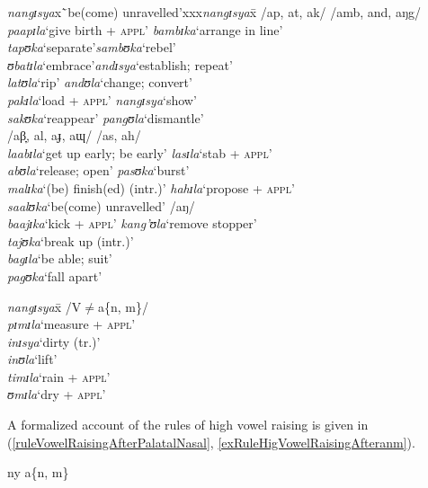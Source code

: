 \begin{exe}
\ex\label{exNoRaisingAC}
\begin{tabbing}
\textit{nangɪsya}x\=`be(come) unravelled'xxx\=\textit{nangɪsya}x\=\kill
/ap, at, ak/ \>\> /amb, and, aŋg/ \\
\textit{paapɪla}\>`give birth + \textsc{appl}' \> \textit{bambɪka}\>`arrange in line'\\
\textit{tapʊka}\>`separate'\>\textit{sambʊka}\>`rebel'\\
\textit{ʊbatɪla}\>`embrace'\>\textit{andɪsya}\>`establish; repeat'\\
\textit{latʊla}\>`rip' \> \textit{andʊla}\>`change; convert'\\
\textit{pakɪla}\>`load + \textsc{appl}' \> \textit{nangɪsya}\>`show'\\
\textit{sakʊka}\>`reappear' \> \textit{pangʊla}\>`dismantle'\\
/aβ̞, al, aɟ, aɰ/\>\> /as, ah/\\
\textit{laabɪla}\>`get up early; be early' \> \textit{lasɪla}\>`stab + \textsc{appl}'\\
\textit{abʊla}\>`release; open' \> \textit{pasʊka}\>`burst'\\
\textit{malɪka}\>`(be) finish(ed) (intr.)' \> \textit{hahɪla}\>\lq propose + \textsc{appl}'\\
\textit{saalʊka}\>`be(come) unravelled' \> /aŋ/\\
\textit{baajɪka}\>`kick + \textsc{appl}' \> \textit{kang'ʊla}\>`remove stopper'\\
\textit{tajʊka}\>`break up (intr.)' \\
\textit{bagɪla}\>\lq be able; suit'\\
\textit{pagʊka}\>`fall apart'
\end{tabbing}
\ex
\label{exNoRaisingVN}
\begin{tabbing}
\textit{nangɪsya}x\=\kill
/V$\neq$a\{n, m\}/\\
\textit{pɪmɪla}\>\lq measure + \textsc{appl}'\\
\textit{inɪsya}\>\lq dirty (tr.)'\\
\textit{inʊla}\>\lq lift'\\
\textit{timɪla}\>\lq rain + \textsc{appl}'\\
\textit{ʊmɪla}\>\lq dry + \textsc{appl}'
\end{tabbing}
\end{exe}

A formalized account of the rules of high vowel raising is given in (\ref{ruleVowelRaisingAfterPalatalNasal}, \ref{exRuleHigVowelRaisingAfteranm}).
\begin{exe}
\ex \label{ruleVowelRaisingAfterPalatalNasal}
	{
	}
	{ny}
\ex \label{exRuleHigVowelRaisingAfteranm}
	{}
{a\{n, m\}}
\end{exe}

